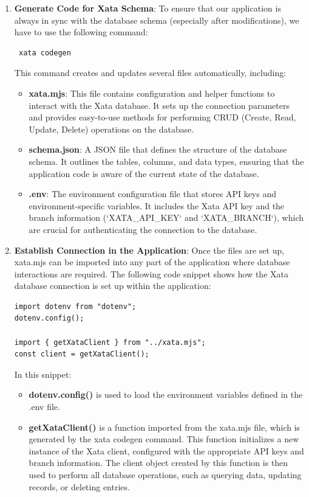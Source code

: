 \begin{enumerate}[resume]
    \item \textbf{Generate Code for Xata Schema}: To ensure that our application is always in sync with the database schema (especially after modifications), we have to use the following command: \begin{verbatim} xata codegen \end{verbatim}
    This command creates and updates several files automatically, including:
    \begin{itemize}
        \item \textbf{xata.mjs}: This file contains configuration and helper functions to interact with the Xata database. It sets up the connection parameters and provides easy-to-use methods for performing CRUD (Create, Read, Update, Delete) operations on the database.
        \item \textbf{schema.json}: A JSON file that defines the structure of the database schema. It outlines the tables, columns, and data types, ensuring that the application code is aware of the current state of the database.
        \item \textbf{.env}: The environment configuration file that stores API keys and environment-specific variables. It includes the Xata API key and the branch information (`XATA\_API\_KEY` and `XATA\_BRANCH`), which are crucial for authenticating the connection to the database.
    \end{itemize}
    \item \textbf{Establish Connection in the Application}: Once the files are set up, xata.mjs can be imported into any part of the application where database interactions are required. The following code snippet shows how the Xata database connection is set up within the application:
    \begin{lstlisting}[caption=Database Connection Setup]
import dotenv from "dotenv";
dotenv.config();

import { getXataClient } from "../xata.mjs";
const client = getXataClient();
    \end{lstlisting}
    In this snippet:
    \begin{itemize}
        \item \textbf{dotenv.config()} is used to load the environment variables defined in the .env file.
        \item \textbf{getXataClient()} is a function imported from the xata.mjs file, which is generated by the xata codegen command. This function initializes a new instance of the Xata client, configured with the appropriate API keys and branch information. The client object created by this function is then used to perform all database operations, such as querying data, updating records, or deleting entries.
    \end{itemize}
\end{enumerate}

